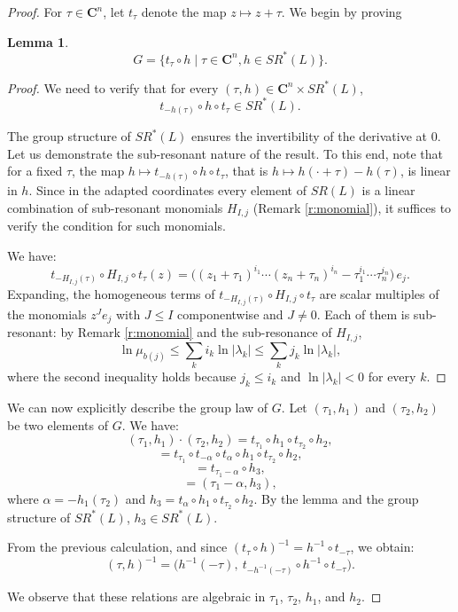 \documentclass[english,11pt]{amsart}
\newtheorem{lemma}[theorem]{Lemma}
\theoremstyle{definition}
\theoremstyle{remark}
\numberwithin{equation}{section}
\newcommand{\C}{\mathbf{C}}
\begin{document}
\begin{proof}
For $\tau \in \C^n$, let $t_\tau$ denote the map $z \mapsto z + \tau$. We begin by proving
\begin{lemma}\label{l:Gform}
\[
G = \{t_\tau \circ h \mid \tau \in \C^n, h \in SR^*(L)\}.
\]
\end{lemma}
\begin{proof}
We need to verify that for every $(\tau, h) \in \C^n \times SR^*(L)$,
\[
t_{-h(\tau)} \circ h \circ t_\tau \in SR^*(L).
\]

The group structure of $SR^*(L)$ ensures the invertibility of the derivative at $0$. Let us demonstrate the sub-resonant nature of the result. To this end, note that for a fixed $\tau$, the map $h\mapsto t_{-h(\tau)}\circ h\circ t_\tau$, that is $h\mapsto h(\cdot+\tau)-h(\tau)$, is linear in $h$. Since in the adapted coordinates every element of $SR(L)$ is a linear combination of sub-resonant monomials $H_{I,j}$ (Remark \ref{r:monomial}), it suffices to verify the condition for such monomials.

We have:
\[
t_{-H_{I,j}(\tau)} \circ H_{I,j} \circ t_\tau (z)
= \big((z_1 + \tau_1)^{i_1} \cdots (z_n + \tau_n)^{i_n} - \tau_1^{i_1} \cdots \tau_n^{i_n}\big)\, e_j .
\]
Expanding, the homogeneous terms of $t_{-H_{I,j}(\tau)} \circ H_{I,j} \circ t_\tau$ are scalar multiples of the monomials $z^J e_j$ with $J\le I$ componentwise and $J\neq0$. Each of them is sub-resonant: by Remark \ref{r:monomial} and the sub-resonance of $H_{I,j}$,
\[
\ln \mu_{b(j)} \leq \sum_k i_k \ln |\lambda_k| \leq \sum_k j_k \ln |\lambda_k|,
\]
where the second inequality holds because $j_k\le i_k$ and $\ln|\lambda_k|<0$ for every $k$.
\end{proof}
We can now explicitly describe the group law of $G$. Let $(\tau_1, h_1)$ and $(\tau_2, h_2)$ be two elements of $G$. We have:
\[
(\tau_1, h_1) \cdot (\tau_2, h_2) = t_{\tau_1} \circ h_1 \circ t_{\tau_2} \circ h_2,
\]
\[
= t_{\tau_1} \circ t_{- \alpha} \circ t_\alpha \circ h_1 \circ t_{\tau_2} \circ h_2,
\]
\[
= t_{\tau_1 - \alpha} \circ h_3,
\]
\[
= (\tau_1 - \alpha, h_3),
\]
where $\alpha = -h_1(\tau_2)$ and $h_3 = t_\alpha \circ h_1 \circ t_{\tau_2} \circ h_2$. By the lemma and the group structure of $SR^*(L)$, $h_3 \in SR^*(L)$.

From the previous calculation, and since $(t_\tau\circ h)^{-1}=h^{-1}\circ t_{-\tau}$, we obtain:
\[
(\tau, h)^{-1} = \big(h^{-1}(-\tau),\ t_{-h^{-1}(-\tau)} \circ h^{-1} \circ t_{-\tau}\big).
\]

We observe that these relations are algebraic in $\tau_1$, $\tau_2$, $h_1$, and $h_2$.
\end{proof}
\end{document}
